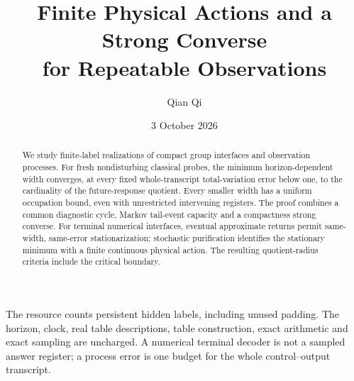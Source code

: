 \documentclass[11pt]{amsart}
\title[Finite actions and a process strong converse]{Finite Physical Actions and a Strong Converse\\for Repeatable Observations}
\author{Qian Qi}
\date{3 October 2026}
\numberwithin{equation}{section}
\theoremstyle{definition}\newtheorem{definition}[theorem]{Definition}
\theoremstyle{remark}\newtheorem{remark}[theorem]{Remark}
\begin{document}
\raggedbottom
\begin{abstract}
We study finite-label realizations of compact group interfaces and
observation processes. For fresh nondisturbing classical probes, the
minimum horizon-dependent width converges, at every fixed
whole-transcript total-variation error below one, to the cardinality
of the future-response quotient. Every smaller width has a uniform
occupation bound, even with unrestricted intervening registers.
The proof combines a common diagnostic cycle, Markov tail-event
capacity and a compactness strong converse. For terminal numerical
interfaces, eventual approximate returns permit same-width,
same-error stationarization; stochastic purification identifies the
stationary minimum with a finite continuous physical action.
The resulting quotient-radius criteria include the critical boundary.
\end{abstract}
\maketitle
\noindent The resource counts persistent hidden labels, including unused
padding. The horizon, clock, real table descriptions, table construction,
exact arithmetic and exact sampling are uncharged. A numerical terminal
decoder is not a sampled answer register; a process error is one budget
for the whole control--output transcript.
















\end{document}
